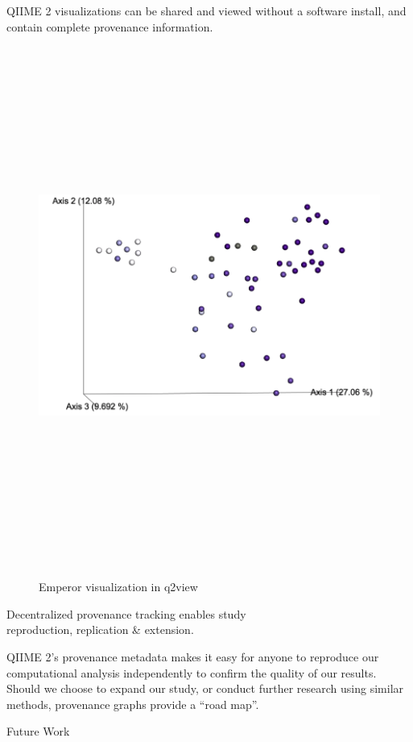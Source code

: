 \documentclass[final]{beamer}
\newlength{\colwidth}
\begin{document}
\begin{frame}[t]
\begin{columns}[t]
\begin{column}{\colwidth}
\begin{block}{QIIME 2 visualizations can be shared and viewed without a software install, and contain complete provenance information.}
    \begin{figure}[tph!]
      {\includegraphics[height=17cm]{assets/emperor}}
      \caption{Emperor visualization in q2view}
    \end{figure}

  \end{block}

  \begin{block}{Decentralized provenance tracking enables study \\ reproduction, replication \& extension.}

    QIIME 2’s provenance metadata makes it easy for anyone to reproduce our
    computational analysis independently to confirm the quality of our results.
    Should we choose to expand our study, or conduct further research using
    similar methods, provenance graphs provide a “road map”.

  \end{block}

  \begin{block}{Future Work}


\end{block}
\end{column}
\end{columns}
\end{frame}
\end{document}
